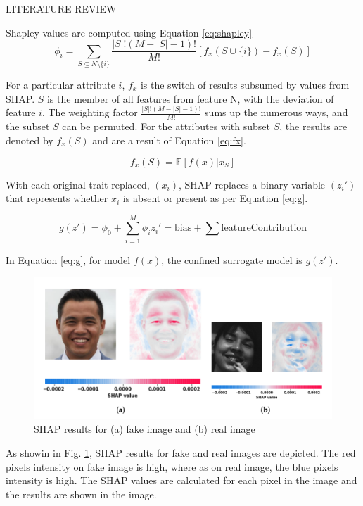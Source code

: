 \begin{section}[]{\uppercase{Literature Review}}
\par Shapley values are computed using Equation \ref{eq:shapley}
\begin{equation}
    \phi_i = \sum_{S \subseteq N \setminus \{i\}} \frac{|S|!(M - |S| - 1)!}{M!} \left[ f_x(S \cup \{i\}) - f_x(S) \right]
    \label{eq:shapley}
    \end{equation}
    
    For a particular attribute $i$, $f_x$ is the switch of results subsumed by values from SHAP. $S$ is the member of all features from feature N, with the deviation of feature $i$. The weighting factor $\frac{|S|!(M - |S| - 1)!}{M!}$ sums up the numerous ways, and the subset $S$ can be permuted. For the attributes with subset $S$, the results are denoted by $f_x(S)$ and are a result of Equation \ref{eq:fx}.
    
    \begin{equation}
    f_x(S) = \mathbb{E}[f(x) | x_S]
    \label{eq:fx}
    \end{equation}
    
    With each original trait replaced, $(x_i)$, SHAP replaces a binary variable $(z_i')$ that represents whether $x_i$ is absent or present as per Equation \ref{eq:g}.
    
    \begin{equation}
    g(z') = \phi_0 + \sum_{i=1}^{M} \phi_i z_i' = \text{bias} + \sum \text{featureContribution}
    \label{eq:g}
    \end{equation}
    
    In Equation \ref{eq:g}, for model $f(x)$, the confined surrogate model is $g(z')$.
    
\begin{figure}[htbp]
    \centering
    \includegraphics[width=\linewidth]{images/shap.png}
    \caption{SHAP results for (a) fake image and (b) real image}
    \label{fig:shap}
\end{figure}

As showin in Fig. \ref{fig:shap}, SHAP results for fake and real images are depicted. The red pixels intensity on fake image is high, where as on real image, the blue pixels intensity is high. The SHAP values are calculated for each pixel in the image and the results are shown in the image.


\end{section}

\pagebreak